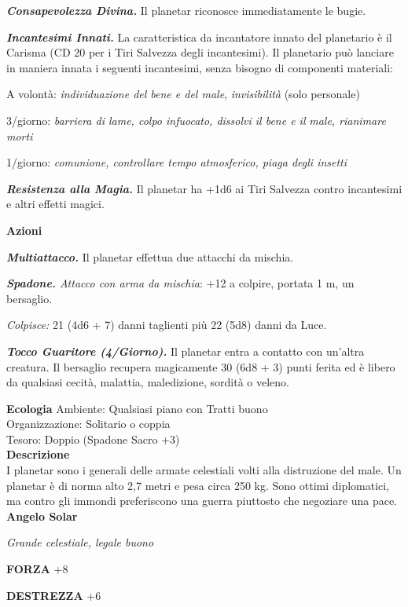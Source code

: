 \begin{multicols}{2}
\emph{\textbf{Consapevolezza Divina.}} Il planetar riconosce immediatamente le bugie.

\emph{\textbf{Incantesimi Innati.}} La caratteristica da incantatore innato del planetario è il Carisma (CD 20 per i Tiri Salvezza degli incantesimi). Il planetario può lanciare in maniera innata i seguenti incantesimi, senza bisogno di componenti materiali:

A volontà: \emph{individuazione del bene e del male}, \emph{invisibilità} (solo personale)

3/giorno: \emph{barriera di lame, colpo infuocato, dissolvi il bene e il} \emph{male, rianimare morti}

1/giorno: \emph{comunione, controllare tempo atmosferico, piaga degli insetti}

\emph{\textbf{Resistenza alla Magia.}} Il planetar ha +1d6 ai Tiri Salvezza contro incantesimi e altri effetti magici.

\textbf{Azioni}

\emph{\textbf{Multiattacco.}} Il planetar effettua due attacchi da mischia.

\emph{\textbf{Spadone.} Attacco con arma da mischia}: +12 a colpire, portata 1 m, un bersaglio.

\emph{Colpisce:} 21 (4d6 + 7) danni taglienti più 22 (5d8) danni da Luce.

\emph{\textbf{Tocco Guaritore (4/Giorno).}} Il planetar entra a contatto con un'altra creatura. Il bersaglio recupera magicamente 30 (6d8 + 3) punti ferita ed è libero da qualsiasi cecità, malattia, maledizione, sordità o veleno.

\textbf{Ecologia}
Ambiente: Qualsiasi piano con Tratti buono\\
Organizzazione: Solitario o coppia\\
Tesoro: Doppio (Spadone Sacro +3)\\
\textbf{Descrizione}\\
I planetar sono i generali delle armate celestiali volti alla distruzione del male. Un planetar è di norma alto 2,7 metri e pesa circa 250 kg. Sono ottimi diplomatici, ma contro gli immondi preferiscono una guerra piuttosto che negoziare una pace.\\


\medskip{}\textbf{Angelo Solar}

\emph{Grande celestiale, legale buono}

\textbf{FORZA} +8

\textbf{DESTREZZA} +6


\end{multicols}
